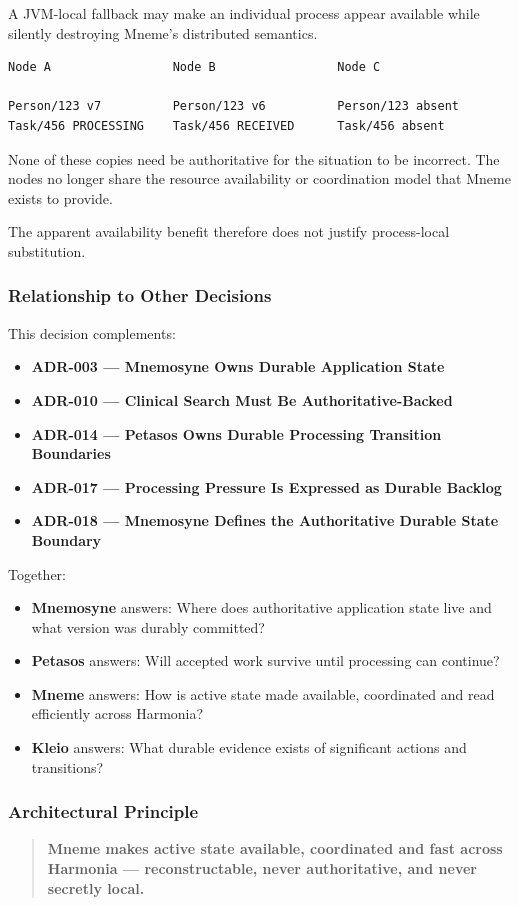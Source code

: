 A JVM-local fallback may make an individual process appear available while silently destroying Mneme's distributed semantics.

\begin{verbatim}
Node A                 Node B                 Node C

Person/123 v7          Person/123 v6          Person/123 absent
Task/456 PROCESSING    Task/456 RECEIVED      Task/456 absent
\end{verbatim}

None of these copies need be authoritative for the situation to be incorrect. The nodes no longer share the resource availability or coordination model that Mneme exists to provide.

The apparent availability benefit therefore does not justify process-local substitution.

\subsubsection{Relationship to Other Decisions}

This decision complements:
\begin{itemize}
    \item \textbf{ADR-003 --- Mnemosyne Owns Durable Application State}
    \item \textbf{ADR-010 --- Clinical Search Must Be Authoritative-Backed}
    \item \textbf{ADR-014 --- Petasos Owns Durable Processing Transition Boundaries}
    \item \textbf{ADR-017 --- Processing Pressure Is Expressed as Durable Backlog}
    \item \textbf{ADR-018 --- Mnemosyne Defines the Authoritative Durable State Boundary}
\end{itemize}

Together:
\begin{itemize}
    \item \textbf{Mnemosyne} answers: Where does authoritative application state live and what version was durably committed?
    \item \textbf{Petasos} answers: Will accepted work survive until processing can continue?
    \item \textbf{Mneme} answers: How is active state made available, coordinated and read efficiently across Harmonia?
    \item \textbf{Kleio} answers: What durable evidence exists of significant actions and transitions?
\end{itemize}

\subsubsection{Architectural Principle}

\begin{quote}
    \textbf{Mneme makes active state available, coordinated and fast across Harmonia --- reconstructable, never authoritative, and never secretly local.}
\end{quote}

